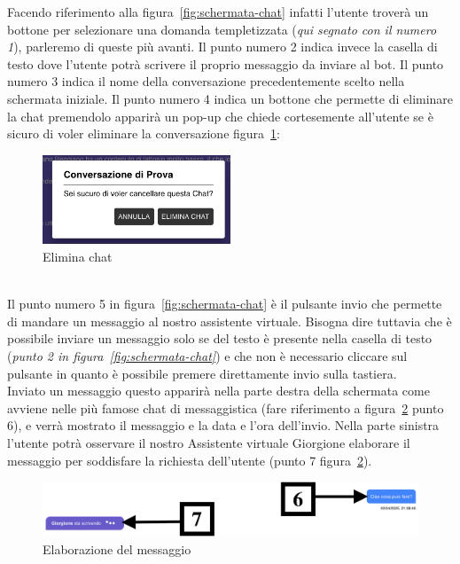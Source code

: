 Facendo riferimento alla figura~\ref{fig:schermata-chat} infatti l'utente troverà un bottone per selezionare una domanda templetizzata (\textit{qui segnato con il numero 1}), parleremo di queste più avanti.
Il punto numero 2 indica invece la casella di testo dove l'utente potrà scrivere il proprio messaggio da inviare al bot.
Il punto numero 3 indica il nome della conversazione precedentemente scelto nella schermata iniziale. Il punto numero 4 indica un bottone che permette di eliminare la chat premendolo apparirà un pop-up che chiede cortesemente all'utente se è sicuro di voler eliminare la conversazione figura~\ref{fig:elimina-chat}:
\begin{figure}[h!]
    \centering
    \includegraphics[width=0.5\textwidth]{./img/eliminaChat.png}
    \caption{Elimina chat}
    \label{fig:elimina-chat}
\end{figure}
\\
Il punto numero 5 in figura~\ref{fig:schermata-chat} è il pulsante invio che permette di mandare un messaggio al nostro assistente virtuale. Bisogna dire tuttavia che è possibile inviare un messaggio solo se del testo è presente nella casella di testo (\textit{punto 2 in figura~\ref{fig:schermata-chat}}) e che non è necessario cliccare sul pulsante in quanto è possibile premere direttamente invio sulla tastiera.
\\
Inviato un messaggio questo apparirà nella parte destra della schermata come avviene nelle più famose chat di messaggistica (fare riferimento a figura~\ref{fig:Elaborazione} punto 6), e verrà mostrato il messaggio e la data e l'ora dell'invio.
Nella parte sinistra l'utente potrà osservare il nostro Assistente virtuale Giorgione elaborare il messaggio per soddisfare la richiesta dell'utente (punto 7 figura~\ref{fig:Elaborazione}).
\begin{figure}[h!]
    \centering
    \includegraphics[width=\textwidth]{./img/SchermataChat2.png}
    \caption{Elaborazione del messaggio}
    \label{fig:Elaborazione}
\end{figure}

